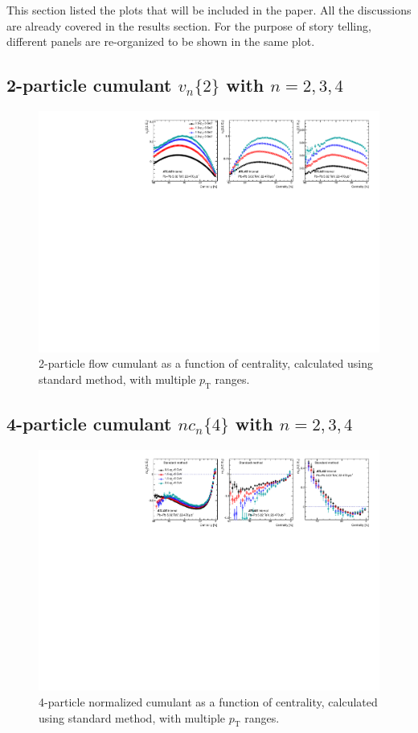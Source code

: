 This section listed the plots that will be included in the paper. All the discussions are already covered in the results section. For the purpose of story telling, different panels are re-organized to be shown in the same plot.

\subsection{2-particle cumulant $v_n\{2\}$ with $n=2,3,4$}

\begin{figure}[H]
\centering
\includegraphics[width=.96\linewidth]{figs/sec_paper/comp_vn2_Cent.pdf}
\caption{2-particle flow cumulant as a function of centrality, calculated using standard method, with multiple $p_\text{T}$ ranges.}
\label{fig:paper_v2}
\end{figure}

\subsection{4-particle cumulant $nc_n\{4\}$ with $n=2,3,4$}

\begin{figure}[H]
\centering
\includegraphics[width=.96\linewidth]{figs/sec_paper/comp_nc4_Cent.pdf}
\caption{4-particle normalized cumulant as a function of centrality, calculated using standard method, with multiple $p_\text{T}$ ranges.}
\label{fig:paper_nc4}
\end{figure}

